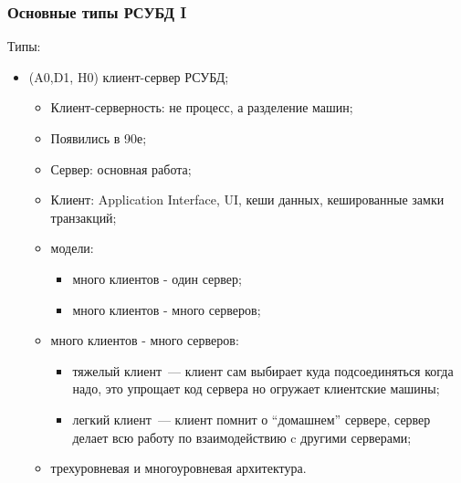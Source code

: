 \documentclass{beamer}
\begin{document}
\begin{frame}
\frametitle{Основные типы РСУБД I}

Типы:
  \begin{itemize}
    \setlength\itemsep{1em}  
    \item (A0,D1, H0) клиент-сервер РСУБД;
    \begin{itemize}
      \item Клиент-серверность: не процесс, а разделение машин;
      \item Появились в 90е;
      \item Сервер: основная работа;
      \item Клиент: Application Interface, UI, кеши данных, кешированные замки транзакций;
      \item модели: 
      \begin{itemize}
      	\item много клиентов - один сервер;
		\item много клиентов - много серверов;
      \end{itemize}
      \item много клиентов - много серверов:
      \begin{itemize}
	    \item тяжелый клиент~--- клиент сам выбирает куда подсоединяться когда надо, это упрощает код сервера но огружает клиентские машины;
	    \item легкий клиент~--- клиент помнит о ``домашнем'' сервере, сервер делает всю работу по взаимодействию c другими серверами;
	  \end{itemize}

      \item трехуровневая и многоуровневая архитектура.
    \end{itemize}

  \end{itemize}

\end{frame}
\end{document}
